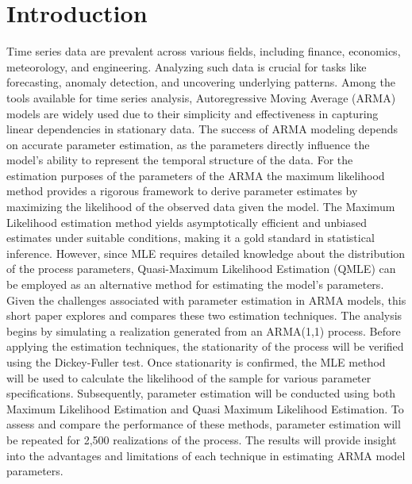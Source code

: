 \documentclass[a4paper,12pt]{article}
\begin{document}
\section{Introduction}
Time series data are prevalent across various fields, including finance, economics, meteorology, and engineering. Analyzing such data is crucial for tasks like forecasting, anomaly detection, and uncovering underlying patterns. Among the tools available for time series analysis, Autoregressive Moving Average (ARMA) models are widely used due to their simplicity and effectiveness in capturing linear dependencies in stationary data.
The success of ARMA modeling depends on accurate parameter estimation, as the parameters directly influence the model's ability to represent the temporal structure of the data. 
For the estimation purposes of the parameters of the ARMA the maximum likelihood method provides a rigorous framework to derive parameter estimates by maximizing the likelihood of the observed data given the model.
The Maximum Likelihood estimation method yields asymptotically efficient and unbiased estimates under suitable conditions, making it a gold standard in statistical inference. However, since MLE requires detailed knowledge about the distribution of the process parameters, Quasi-Maximum Likelihood Estimation (QMLE) can be employed as an alternative method for estimating the model's parameters.
Given the challenges associated with parameter estimation in ARMA models, this short paper explores and compares these two estimation techniques.
 The analysis begins by simulating a realization generated from an ARMA(1,1) process. Before applying the estimation techniques, the stationarity of the process will be verified using the Dickey-Fuller test.
Once stationarity is confirmed, the MLE method will be used to calculate the likelihood of the sample for various parameter specifications. 
Subsequently, parameter estimation will be conducted using both Maximum Likelihood Estimation and Quasi Maximum Likelihood Estimation. 
To assess and compare the performance of these methods, parameter estimation will be repeated for 2,500 realizations of the process. The results will provide insight into the advantages and limitations of each technique in estimating ARMA model parameters.
\end{document}
